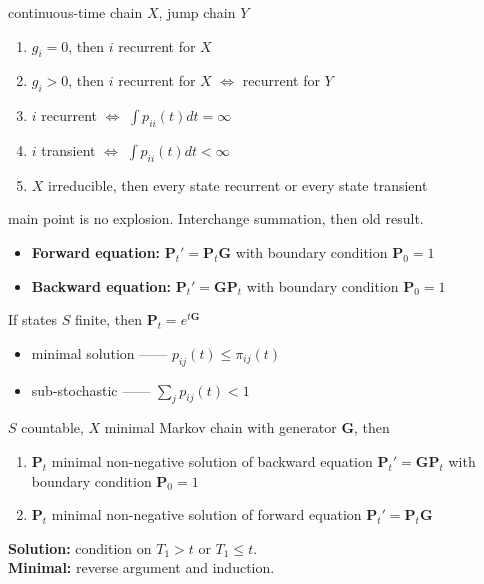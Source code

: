 \begin{thm}
    continuous-time chain $X$, jump chain $Y$
    \begin{enumerate}
        \item $g_i = 0$, then $i$ recurrent for $X$
        \item $g_i > 0$, then $i$ recurrent for $X$ $\iff$ recurrent for $Y$
        \item $i$ recurrent $\iff$ $\int p_{ii}(t)dt = \infty$
        \item $i$ transient $\iff$ $\int p_{ii}(t)dt < \infty$
        \item $X$ irreducible, then every state recurrent or every state transient
    \end{enumerate}
\end{thm}
\begin{pf}
    main point is no explosion.
    Interchange summation, then old result.
\end{pf}

\begin{itemize}
    \item \textbf{Forward equation:} $\bm P_t' = \bm P_t \bm G$ with boundary condition $\bm P_0 = 1$
    \item \textbf{Backward equation:} $\bm P_t' = \bm G \bm P_t$  with boundary condition $\bm P_0 = 1$
\end{itemize}

\begin{fact}
    If states $S$ finite, then $\bm P_t = e^{t\bm G}$
\end{fact}

\begin{itemize}
    \item minimal solution ------ $p_{ij}(t) \leq \pi_{ij}(t)$
    \item sub-stochastic ------ $\sum_j p_{ij}(t) < 1$
\end{itemize}

\begin{thm}
    $S$ countable, $X$ minimal Markov chain with generator $\bm G$, then
    \begin{enumerate}
        \item $\bm P_t$ minimal non-negative solution of backward equation $\bm P_t' = \bm G \bm P_t$  with boundary condition $\bm P_0 = 1$
        \item $\bm P_t$ minimal non-negative solution of forward equation $\bm P_t' = \bm P_t \bm G$
    \end{enumerate}
\end{thm}
\begin{pf}
    \textbf{Solution:} condition on $T_1 > t$ or $T_1 \leq t$.\\
    \textbf{Minimal:} reverse argument and induction.
\end{pf}

